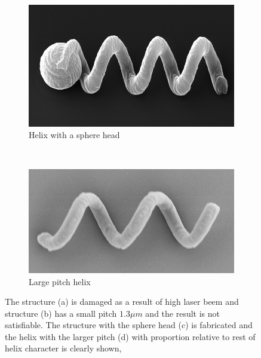 \documentclass[12pt,a4paper,titlepage]{report}
\begin{document}
\begin{figure}
  \begin{subfigure}[b]{0.45\textwidth}
                \includegraphics[width=\textwidth]{sphereFabricated}
                \caption{Helix with a sphere head}
                \label{sphereFabricated}
        \end{subfigure}~
       \begin{subfigure}[b]{0.53\textwidth}
                \includegraphics[width=\textwidth]{largePitch}
                \caption{Large pitch helix}
                \label{largePitch}
        \end{subfigure}
        \caption[Fabricated structures]{The structure (a) is damaged as a result of high 
laser beem and structure (b) has a small pitch $1.3 \mu m$ and the result is not satisfiable. The structure
with the sphere head (c) is fabricated and the helix with the larger pitch (d) with proportion relative to
rest of helix character is clearly shown,}\label{Damaged structures}

       

\end{figure}
\end{document}
